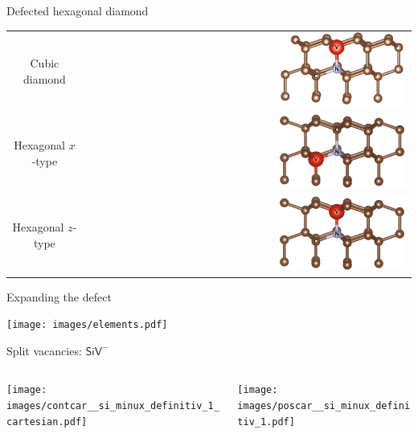 \documentclass[handout]{beamer}
\begin{document}
\begin{frame}{Defected hexagonal diamond}
  \begin{center}
    \begin{tabular}{cr}
      Cubic diamond   & \includegraphics[width=0.4\textwidth]{images/POSCAR_16_view.png}\\
      Hexagonal $ x $-type &\includegraphics[width=0.4\textwidth]{images/POSCAR_16_x_view.png}\\
      Hexagonal $ z $-type & \includegraphics[width=0.4\textwidth]{images/POSCAR_16_z_view.png}
    \end{tabular}
  \end{center}

\end{frame}


\begin{frame}{Expanding the defect}
  \begin{center}
    \texttt{[image: images/elements.pdf]}
  \end{center}
\end{frame}

\begin{frame}{Split vacancies: $ \mathsf{SiV}^{-} $  }
  \def\splitTrim{6}
  \def\splitTrimVertical{2}
  \begin{columns}
    \begin{column}{0.5\textwidth}
      \texttt{[image: images/contcar\_\_si\_minux\_definitiv\_1\_cartesian.pdf]}
    \end{column}
    \begin{column}{0.5\textwidth}
      \texttt{[image: images/poscar\_\_si\_minux\_definitiv\_1.pdf]}
    \end{column}
  \end{columns}
\end{frame}
\end{document}

